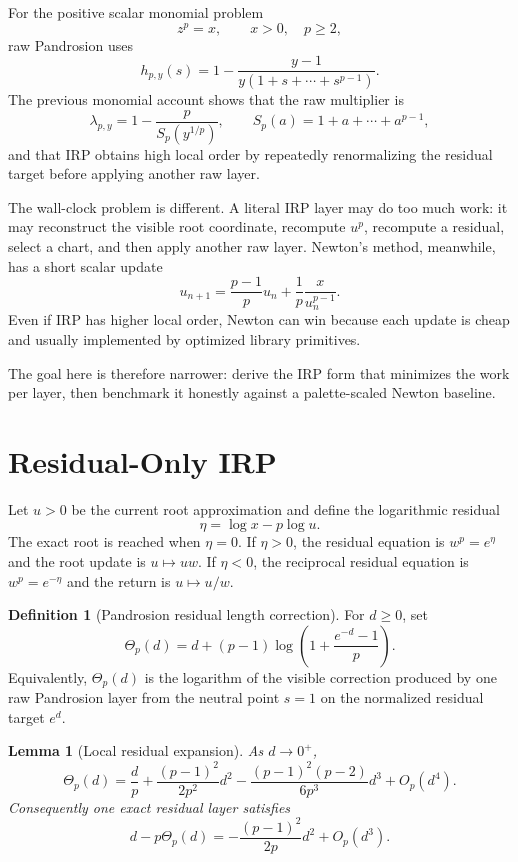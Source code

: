 \documentclass[10pt,a4paper]{article}
\theoremstyle{plain}
\newtheorem{lemma}[theorem]{Lemma}
\theoremstyle{definition}
\newtheorem{definition}[theorem]{Definition}
\begin{document}
For the positive scalar monomial problem
\[
  z^p=x,\qquad x>0,\quad p\ge2,
\]
raw Pandrosion uses
\[
  h_{p,y}(s)=1-\frac{y-1}{y(1+s+\cdots+s^{p-1})}.
\]
The previous monomial account shows that the raw multiplier is
\[
  \lambda_{p,y}=1-\frac{p}{S_p(y^{1/p})},
  \qquad S_p(a)=1+a+\cdots+a^{p-1},
\]
and that IRP obtains high local order by repeatedly renormalizing the residual
target before applying another raw layer.

The wall-clock problem is different.  A literal IRP layer may do too much work:
it may reconstruct the visible root coordinate, recompute $u^p$, recompute a
residual, select a chart, and then apply another raw layer.  Newton's method,
meanwhile, has a short scalar update
\[
  u_{n+1}=\frac{p-1}{p}u_n+\frac{1}{p}\frac{x}{u_n^{p-1}}.
\]
Even if IRP has higher local order, Newton can win because each update is cheap
and usually implemented by optimized library primitives.

The goal here is therefore narrower: derive the IRP form that minimizes the
work per layer, then benchmark it honestly against a palette-scaled Newton
baseline.

\section{Residual-Only IRP}

Let $u>0$ be the current root approximation and define the logarithmic residual
\[
  \eta=\log x-p\log u.
\]
The exact root is reached when $\eta=0$.  If $\eta>0$, the residual equation is
$w^p=e^\eta$ and the root update is $u\mapsto uw$.  If $\eta<0$, the reciprocal
residual equation is $w^p=e^{-\eta}$ and the return is $u\mapsto u/w$.

\begin{definition}[Pandrosion residual length correction]
For $d\ge0$, set
\[
  \Theta_p(d)
    =d+(p-1)\log\!\left(1+\frac{e^{-d}-1}{p}\right).
\]
Equivalently, $\Theta_p(d)$ is the logarithm of the visible correction produced
by one raw Pandrosion layer from the neutral point $s=1$ on the normalized
residual target $e^d$.
\end{definition}

\begin{lemma}[Local residual expansion]
As $d\to0^+$,
\[
  \Theta_p(d)
    =\frac{d}{p}
      +\frac{(p-1)^2}{2p^2}d^2
      -\frac{(p-1)^2(p-2)}{6p^3}d^3
      +O_p(d^4).
\]
Consequently one exact residual layer satisfies
\[
  d-p\Theta_p(d)
    =-\frac{(p-1)^2}{2p}d^2+O_p(d^3).
\]
\end{lemma}
\end{document}
